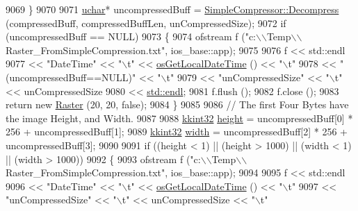 \begin{DoxyCode}
9069   \}
9070 
9071   \hyperlink{namespace_k_k_b_ace9969169bf514f9ee6185186949cdf7}{uchar}*  uncompressedBuff = \hyperlink{class_k_k_b_1_1_simple_compressor_ac36d8a5ef877583713f50bd241d3e8c0}{SimpleCompressor::Decompress} (compressedBuff,
       compressedBuffLen, unCompressedSize);
9072   \textcolor{keywordflow}{if}  (uncompressedBuff == NULL)
9073   \{
9074     ofstream f (\textcolor{stringliteral}{"c:\(\backslash\)\(\backslash\)Temp\(\backslash\)\(\backslash\)Raster\_FromSimpleCompression.txt"}, ios\_base::app);
9075 
9076     f << std::endl
9077       << \textcolor{stringliteral}{"DateTime"}                 << \textcolor{stringliteral}{"\(\backslash\)t"}  <<  \hyperlink{namespace_k_k_b_af54c205cde0465bcb2c74f3881a96413}{osGetLocalDateTime} () << \textcolor{stringliteral}{"\(\backslash\)t"}
9078       << \textcolor{stringliteral}{"(uncompressedBuff==NULL)"} << \textcolor{stringliteral}{"\(\backslash\)t"} 
9079       << \textcolor{stringliteral}{"unCompressedSize"}         << \textcolor{stringliteral}{"\(\backslash\)t"} << unCompressedSize
9080       << \hyperlink{namespace_k_k_b_ad1f50f65af6adc8fa9e6f62d007818a8}{std::endl};
9081       f.flush ();
9082       f.close ();
9083     \textcolor{keywordflow}{return} \textcolor{keyword}{new} \hyperlink{class_k_k_b_1_1_raster_a19ec88efff547c1fcda863172fef620b}{Raster} (20, 20, \textcolor{keyword}{false});
9084   \}
9085 
9086   \textcolor{comment}{// The first Four Bytes have the image Height, and Width.}
9087 
9088   \hyperlink{namespace_k_k_b_a8fa4952cc84fda1de4bec1fbdd8d5b1b}{kkint32}  \hyperlink{class_k_k_b_1_1_raster_af39ff189de4fbb6de98392e187efafb7}{height} = uncompressedBuff[0] * 256 +  uncompressedBuff[1];
9089   \hyperlink{namespace_k_k_b_a8fa4952cc84fda1de4bec1fbdd8d5b1b}{kkint32}  \hyperlink{class_k_k_b_1_1_raster_ae0bcc103e191c3421d7692dc69ceb554}{width}  = uncompressedBuff[2] * 256 +  uncompressedBuff[3];
9090 
9091   \textcolor{keywordflow}{if}  ((height < 1)  ||  (height > 1000)  ||  (width < 1)  ||  (width > 1000))
9092   \{
9093     ofstream f (\textcolor{stringliteral}{"c:\(\backslash\)\(\backslash\)Temp\(\backslash\)\(\backslash\)Raster\_FromSimpleCompression.txt"}, ios\_base::app);
9094 
9095     f << std::endl
9096       << \textcolor{stringliteral}{"DateTime"}         << \textcolor{stringliteral}{"\(\backslash\)t"}  << \hyperlink{namespace_k_k_b_af54c205cde0465bcb2c74f3881a96413}{osGetLocalDateTime} () << \textcolor{stringliteral}{"\(\backslash\)t"}
9097       << \textcolor{stringliteral}{"unCompressedSize"} << \textcolor{stringliteral}{"\(\backslash\)t"}  << unCompressedSize      << \textcolor{stringliteral}{"\(\backslash\)t"}

\end{DoxyCode}
